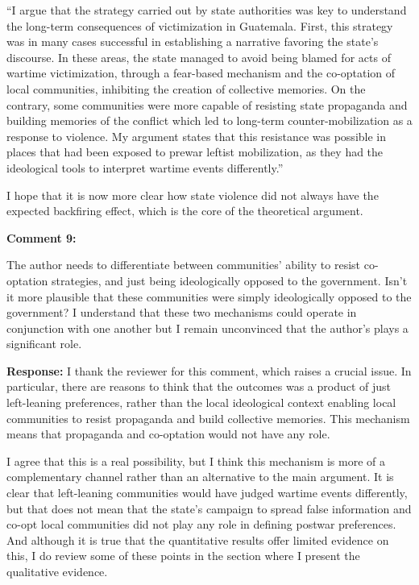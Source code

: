 \documentclass[12pt, a4paper, notitlepage]{article}
\begin{document}
``I argue that the strategy carried out by state authorities was key to understand the long-term consequences of victimization in Guatemala.
First, this strategy was in many cases successful in establishing a narrative favoring the state's discourse.
In these areas, the state managed to avoid being blamed for acts of wartime victimization, through a fear-based mechanism and the co-optation of local communities, inhibiting the creation of collective memories.
On the contrary, some communities were more capable of resisting state propaganda and building memories of the conflict which led to long-term counter-mobilization as a response to violence.
My argument states that this resistance was possible in places that had been exposed to prewar leftist mobilization, as they had the ideological tools to interpret wartime events differently.''

I hope that it is now more clear how state violence did not always have the expected backfiring effect, which is the core of the theoretical argument.

\vspace{15pt}
\noindent\textbf{Comment 9:}
\begin{displayquote}
The author needs to differentiate between communities' ability to resist co-optation strategies, and just being ideologically opposed to the government. Isn't it more plausible that these communities were simply ideologically opposed to the government? I understand that these two mechanisms could operate in conjunction with one another but I remain unconvinced that the author's plays a significant role.
\end{displayquote}

\noindent\textbf{Response:} I thank the reviewer for this comment, which raises a crucial issue. In particular, there are reasons to think that the outcomes was a product of just left-leaning preferences, rather than the local ideological context enabling local communities to resist propaganda and build collective memories. This mechanism means that propaganda and co-optation would not have any role.

I agree that this is a real possibility, but I think this mechanism is more of a complementary channel rather than an alternative to the main argument. It is clear that left-leaning communities would have judged wartime events differently, but that does not mean that the state's campaign to spread false information and co-opt local communities did not play any role in defining postwar preferences. And although it is true that the quantitative results offer limited evidence on this, I do review some of these points in the section where I present the qualitative evidence.
\end{document}
